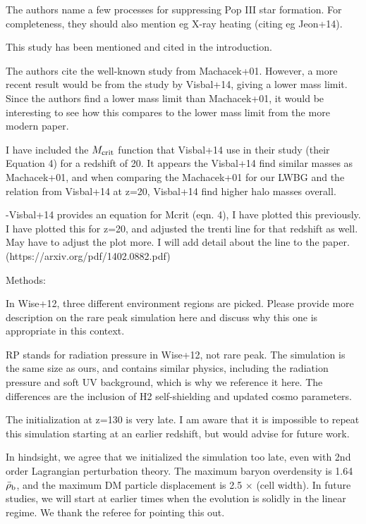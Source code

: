 \documentclass[11pt]{article}
\newenvironment{referee}[1][]{%
    \ignorespaces%
    \begin{mdframed}[style=myquotestyle,#1]%
}{%
    \end{mdframed}%
    \ignorespacesafterend%
}%
\begin{document}
\begin{referee}
The authors name a few processes for suppressing Pop III star formation. For completeness, they should also mention eg X-ray heating (citing eg Jeon+14).
\end{referee}
This study has been mentioned and cited in the introduction.

\begin{referee}
The authors cite the well-known study from Machacek+01. However, a more recent result would be from the study by Visbal+14, giving a lower mass limit. Since the authors find a lower mass limit than Machacek+01, it would be interesting to see how this compares to the lower mass limit from the more modern paper.
\end{referee}
I have included the $M_{\rm crit}$ function that Visbal+14 use in their study (their Equation 4) for a redshift of 20. It appears the Visbal+14 find similar masses as Machacek+01, and when comparing the Machacek+01 for our LWBG and the relation from Visbal+14 at z=20, Visbal+14 find higher halo masses overall. 

-Visbal+14 provides an equation for Mcrit (eqn. 4), I have plotted this previously. I have plotted this for z=20, and adjusted the trenti line for that redshift as well. May have to adjust the plot more. I will add detail about the line to the paper. (https://arxiv.org/pdf/1402.0882.pdf) 

\begin{referee}
Methods:

In Wise+12, three different environment regions are picked. Please provide more description on the rare peak simulation here and discuss why this one is appropriate in this context.
\end{referee}
RP stands for radiation pressure in Wise+12, not rare peak. The simulation is the same size as ours, and contains similar physics, including the radiation pressure and soft UV background, which is why we reference it here. The differences are the inclusion of H2 self-shielding and updated cosmo parameters.
 
\begin{referee}
The initialization at z=130 is very late. I am aware that it is impossible to repeat this simulation starting at an earlier redshift, but would advise for future work.
\end{referee}

In hindsight, we agree that we initialized the simulation too late, even with 2nd order Lagrangian perturbation theory.  The maximum baryon overdensity is 1.64$\bar{\rho}_{\rm b}$, and the maximum DM particle displacement is 2.5 $\times$ (cell width).  In future studies, we will start at earlier times when the evolution is solidly in the linear regime.  We thank the referee for pointing this out.
\end{document}
